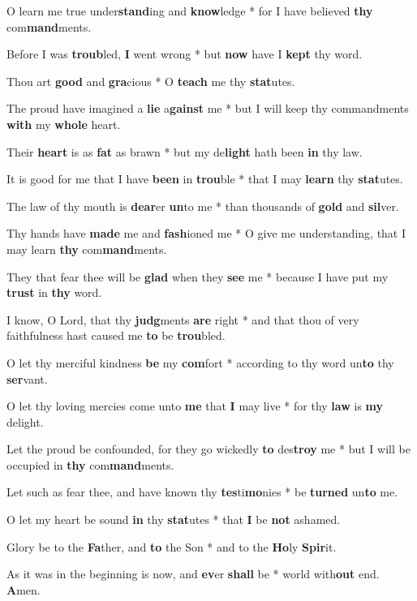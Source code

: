 \begin{multicols}{2}
	O learn me true under\textbf{stand}ing and \textbf{know}ledge * for I have believed \textbf{thy} com\textbf{mand}ments.
	
	Before I was \textbf{troub}led, \textbf{I} went wrong * but \textbf{now} have I \textbf{kept} thy word.
	
	Thou art \textbf{good} and \textbf{gra}cious * O \textbf{teach} me thy \textbf{stat}utes.
	
	The proud have imagined a \textbf{lie} a\textbf{gainst} me * but I will keep thy commandments \textbf{with} my \textbf{whole} heart.
	
	Their \textbf{heart} is as \textbf{fat} as brawn * but my de\textbf{light} hath been \textbf{in} thy law.
	
	It is good for me that I have \textbf{been} in \textbf{trou}ble * that I may \textbf{learn} thy \textbf{stat}utes.
	
	The law of thy mouth is \textbf{dear}er \textbf{un}to me * than thousands of \textbf{gold} and \textbf{sil}ver.
	
	Thy hands have \textbf{made} me and \textbf{fash}ioned me * O give me understanding, that I may learn \textbf{thy} com\textbf{mand}ments.
	
	They that fear thee will be \textbf{glad} when they \textbf{see} me * because I have put my \textbf{trust} in \textbf{thy} word.
	
	I know, O Lord, that thy \textbf{judg}ments \textbf{are} right * and that thou of very faithfulness hast caused me \textbf{to} be \textbf{trou}bled.
	
	O let thy merciful kindness \textbf{be} my \textbf{com}fort * according to thy word un\textbf{to} thy \textbf{ser}vant.
	
	O let thy loving mercies come unto \textbf{me} that \textbf{I} may live * for thy \textbf{law} is \textbf{my} delight.
	
	Let the proud be confounded, for they go wickedly \textbf{to} des\textbf{troy} me * but I will be occupied in \textbf{thy} com\textbf{mand}ments.
	
	Let such as fear thee, and have known thy \textbf{tes}ti\textbf{mo}nies * be \textbf{turned} un\textbf{to} me.
	
	O let my heart be sound \textbf{in} thy \textbf{stat}utes * that \textbf{I} be \textbf{not} ashamed.
	
	Glory be to the \textbf{Fa}ther, and \textbf{to} the Son * and to the \textbf{Ho}ly \textbf{Spir}it.
	
	As it was in the beginning is now, and \textbf{ev}er \textbf{shall} be * world with\textbf{out} end. \textbf{A}men.
\end{multicols}